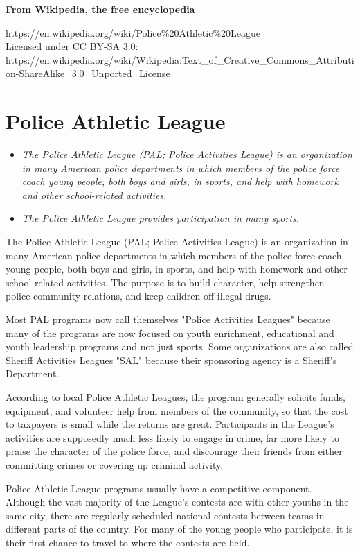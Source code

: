 \textbf{From Wikipedia, the free encyclopedia}

https://en.wikipedia.org/wiki/Police\%20Athletic\%20League\\
Licensed under CC BY-SA 3.0:\\
https://en.wikipedia.org/wiki/Wikipedia:Text\_of\_Creative\_Commons\_Attribution-ShareAlike\_3.0\_Unported\_License

\section{Police Athletic League}\label{police-athletic-league}

\begin{itemize}
\item
  \emph{The Police Athletic League (PAL; Police Activities League) is an
  organization in many American police departments in which members of
  the police force coach young people, both boys and girls, in sports,
  and help with homework and other school-related activities.}
\item
  \emph{The Police Athletic League provides participation in many
  sports.}
\end{itemize}

The Police Athletic League (PAL; Police Activities League) is an
organization in many American police departments in which members of the
police force coach young people, both boys and girls, in sports, and
help with homework and other school-related activities. The purpose is
to build character, help strengthen police-community relations, and keep
children off illegal drugs.

Most PAL programs now call themselves "Police Activities Leagues"
because many of the programs are now focused on youth enrichment,
educational and youth leadership programs and not just sports. Some
organizations are also called Sheriff Activities Leagues "SAL" because
their sponsoring agency is a Sheriff's Department.

According to local Police Athletic Leagues, the program generally
solicits funds, equipment, and volunteer help from members of the
community, so that the cost to taxpayers is small while the returns are
great. Participants in the League's activities are supposedly much less
likely to engage in crime, far more likely to praise the character of
the police force, and discourage their friends from either committing
crimes or covering up criminal activity.

Police Athletic League programs usually have a competitive component.
Although the vast majority of the League's contests are with other
youths in the same city, there are regularly scheduled national contests
between teams in different parts of the country. For many of the young
people who participate, it is their first chance to travel to where the
contests are held.

